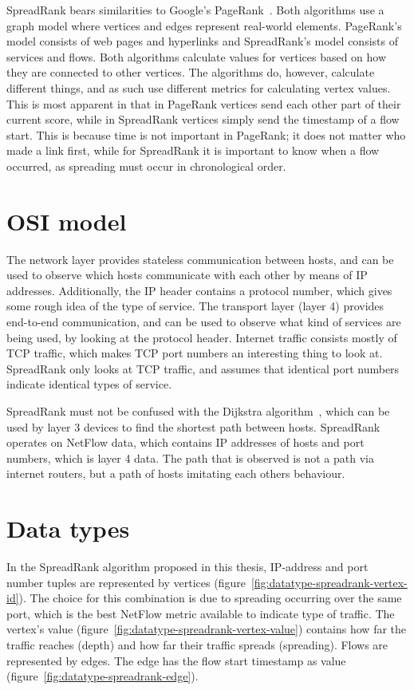 SpreadRank bears similarities to Google's PageRank~\cite{page1999pagerank}.
Both algorithms use a graph model where vertices and edges represent real-world elements.
PageRank's model consists of web pages and hyperlinks and
 SpreadRank's model consists of services and flows.
Both algorithms calculate values for vertices based on how they are connected to other vertices.
The algorithms do, however, calculate different things,
 and as such use different metrics for calculating vertex values.
This is most apparent in that in PageRank vertices send each other part of their current score,
 while in SpreadRank vertices simply send the timestamp of a flow start.
This is because time is not important in PageRank; it does not matter who made a link first,
 while for SpreadRank it is important to know when a flow occurred,
 as spreading must occur in chronological order.


\section{OSI model}
The \gls{network layer} provides stateless communication between hosts, and can be used to observe which hosts communicate with each other by means of IP addresses.
Additionally, the IP header contains a protocol number, which gives some rough idea of the type of service.
The transport layer (layer 4) provides end-to-end communication, and can be used to observe what kind of services are being used, by looking at the protocol header.
Internet traffic consists mostly of TCP traffic, which makes TCP port numbers an interesting thing to look at.
SpreadRank only looks at TCP traffic, and assumes that identical port numbers indicate identical types of service.

SpreadRank must not be confused with the Dijkstra algorithm~\cite{dijkstra1959note},
 which can be used by layer 3 devices to find the shortest path between hosts.
SpreadRank operates on NetFlow data, which contains IP addresses of hosts and port numbers, which is layer 4 data.
The path that is observed is not a path via internet routers, but a path of hosts imitating each others behaviour.


\section{Data types}
\label{sec:data-types}
In the SpreadRank algorithm proposed in this thesis,
 IP-address and port number tuples are represented by vertices (figure~\ref{fig:datatype-spreadrank-vertex-id}).
The choice for this combination is due to \gls{spreading} occurring over the same port, which is the best NetFlow metric available to indicate type of traffic.
The vertex's value (figure~\ref{fig:datatype-spreadrank-vertex-value}) contains how far the traffic reaches (\gls{depth}) and how far their traffic spreads (\gls{spreading}).
Flows are represented by edges.
The edge has the flow start timestamp as value (figure~\ref{fig:datatype-spreadrank-edge}).


